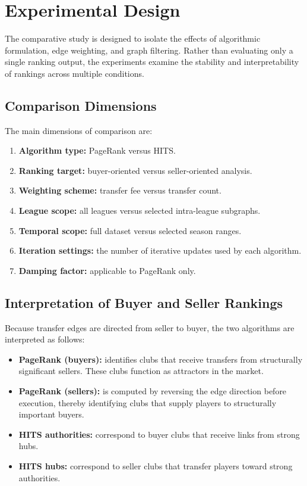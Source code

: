 \section{Experimental Design}
\label{sec:experiments}

The comparative study is designed to isolate the effects of algorithmic formulation, edge weighting, and graph filtering. Rather than evaluating only a single ranking output, the experiments examine the stability and interpretability of rankings across multiple conditions.

\subsection{Comparison Dimensions}
\label{subsec:comparison_dimensions}

The main dimensions of comparison are:
\begin{enumerate}
    \item \textbf{Algorithm type:} PageRank versus HITS.
    \item \textbf{Ranking target:} buyer-oriented versus seller-oriented analysis.
    \item \textbf{Weighting scheme:} transfer fee versus transfer count.
    \item \textbf{League scope:} all leagues versus selected intra-league subgraphs.
    \item \textbf{Temporal scope:} full dataset versus selected season ranges.
    \item \textbf{Iteration settings:} the number of iterative updates used by each algorithm.
    \item \textbf{Damping factor:} applicable to PageRank only.
 \end{enumerate}

\subsection{Interpretation of Buyer and Seller Rankings}
\label{subsec:buyer_seller_interpretation}

Because transfer edges are directed from seller to buyer, the two algorithms are interpreted as follows:
\begin{itemize}
    \item \textbf{PageRank (buyers):} identifies clubs that receive transfers from structurally significant sellers. These clubs function as attractors in the market.
    \item \textbf{PageRank (sellers):} is computed by reversing the edge direction before execution, thereby identifying clubs that supply players to structurally important buyers.
    \item \textbf{HITS authorities:} correspond to buyer clubs that receive links from strong hubs.
    \item \textbf{HITS hubs:} correspond to seller clubs that transfer players toward strong authorities.
\end{itemize}

